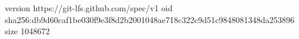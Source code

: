 version https://git-lfs.github.com/spec/v1
oid sha256:db9d60caf1be030f9e3f8d2b2001048ae718c322c9d51c9848081348da253896
size 1048672
